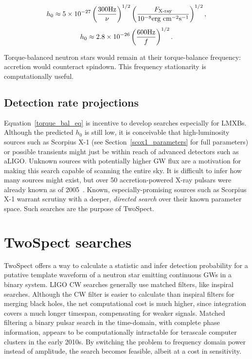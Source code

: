 \begin{equation}
h_{0} \approx 5\times10^{-27}\left(\frac{300\textup{Hz}}{\nu}\right)^{1/2}\left(\frac{F_\textup{X-ray}}{10^{-8}\textup{erg cm}^{-2}\textup{s}^{-1}}\right)^{1/2},
\label{torque_bal_eq}
\end{equation}
\begin{equation}
h_{0} \approx 2.8\times10^{-26}\left(\frac{600\textup{Hz}}{f}\right)^{1/2}.
\label{ScoX1_torque_bal}
\end{equation}



\noindent Torque-balanced neutron stars would remain at their torque-balance frequency: accretion would counteract spindown.
This frequency stationarity is computationally useful.

            \subsection{Detection rate projections}
            \label{rate_projections}

Equation~\ref{torque_bal_eq} is incentive to develop searches especially for LMXBs.
Although the predicted $h_0$ is still low, it is conceivable that high-luminosity sources such as Scorpius X-1 (see Section~\ref{scox1_parameters} for full parameters) or possible transients might just be within reach of advanced detectors such as aLIGO.
Unknown sources with potentially higher GW flux are a motivation for making this search capable of scanning the entire sky.
It is difficult to infer how many sources might exist, but over 50 accretion-powered X-ray pulsars were already known as of 2005~\cite{ManchesterATNF2005}.
Known, especially-promising sources such as Scorpius X-1 warrant scrutiny with a deeper, \textit{directed search} over their known parameter space.
Such searches are the purpose of TwoSpect.

        \section{TwoSpect searches}
        \label{all-sky}

TwoSpect offers a way to calculate a statistic and infer detection probability for a putative template waveform of a neutron star emitting continuous GWs in a binary system.
LIGO CW searches generally use matched filters, like inspiral searches. 
Although the CW filter is easier to calculate than inspiral filters for merging black holes, the net computational cost is much higher, since integration covers a much longer timespan, compensating for weaker signals. 
Matched filtering a binary pulsar search in the time-domain, with complete phase information, appears to be computationally intractable for terascale computer clusters in the early 2010s. 
By switching the problem to frequency domain power instead of amplitude, the search becomes feasible, albeit at a cost in sensitivity.

